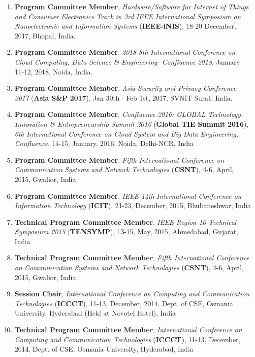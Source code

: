 \begin{enumerate}
\item
\textbf{Program Committee Member},\textit{ Hardware/Software for Internet of Things and Consumer Electronics Track in 3rd IEEE International Symposium on Nanoelectronic and Information Systems} (\textbf{IEEE-iNIS}), 18-20 December, 2017, Bhopal, India.

\item
\textbf{Program Committee Member}, \textit{2018 8th International Conference on Cloud Computing, Data Science \& Engineering- Confluence 2018}, January 11-12, 2018, Noida, India.

\item
\textbf{Program Committee Member}, \textit{Asia Security and Privacy Conference 2017} (\textbf{Asia S\&P 2017}), Jan 30th - Feb 1st, 2017, SVNIT Surat, India.

\item
\textbf{Program Committee Member},  \textit{Confluence-2016: GLOBAL Technology, Innovation \& Entrepreneurship Summit 2016 }(\textbf{Global TIE Summit 2016}),\textit{ 6th International Conference on Cloud System and Big Data Engineering, Confluence}, 14-15, January, 2016, Noida, Delhi-NCR, India

\item
\textbf{Program Committee Member},  \textit{Fifth International Conference on Communication Systems and Network Technologies }(\textbf{CSNT}), 4-6, April, 2015, Gwalior, India

\item
\textbf{Program Committee Member}, \textit{IEEE 14th International Conference on Information Technology} (\textbf{ICIT}), 21-23, December, 2015, Bhubaneshwar, India

\item
\textbf{Technical Program Committee Member}, \textit{IEEE Region 10 Technical Symposium 2015} (\textbf{TENSYMP}), 13-15, May, 2015, Ahmedabad, Gujarat, India

\item
\textbf{Technical Program Committee Member}, \textit{Fifth International Conference on Communication Systems and Network Technologies} (\textbf{CSNT}), 4-6, April, 2015, Gwalior, India.

\item
\textbf{Session Chair}, \textit{International Conference on Computing and Communication Technologies} (\textbf{ICCCT}), 11-13, December, 2014, Dept. of CSE, Osmania University, Hyderabad (Held at Novotel Hotel), India

\item
\textbf{Technical Program Committee Member}, \textit{International Conference on Computing and Communication Technologies }(\textbf{ICCCT}), 11-13, December, 2014, Dept. of CSE, Osmania University, Hyderabad, India


\end{enumerate}
